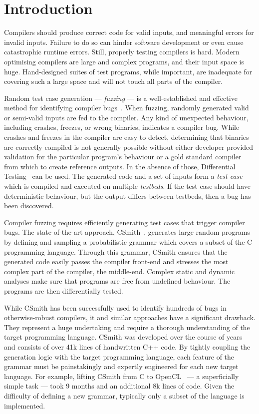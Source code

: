 \section{Introduction}

Compilers should produce correct code for valid inputs, and meaningful errors for invalid inputs. Failure to do so can hinder software development or even cause catastrophic runtime errors. Still, properly testing compilers is hard. Modern optimising compilers are large and complex programs, and their input space is huge. Hand-designed suites of test programs, while important, are inadequate for covering such a large space and will not touch all parts of the compiler.

Random test case generation --- \emph{fuzzing} --- is a well-established and effective method for identifying compiler bugs~\cite{Chen2014a,Chen2013,Kossatchev2005}. When fuzzing, randomly generated valid or semi-valid inputs are fed to the compiler. Any kind of unexpected behaviour, including crashes, freezes, or wrong binaries, indicates a compiler bug. While crashes and freezes in the compiler are easy to detect, determining that binaries are correctly compiled is not generally possible without either developer provided validation for the particular program's behaviour or a gold standard compiler from which to create reference outputs. In the absence of those, Differential Testing~\cite{McKeeman1998} can be used. The generated code and a set of inputs form a \emph{test case} which is compiled and executed on multiple \emph{testbeds}. If the test case should have deterministic behaviour, but the output differs between testbeds, then a bug has been discovered.

Compiler fuzzing requires efficiently generating test cases that trigger compiler bugs. The state-of-the-art approach, CSmith~\cite{Yang2011}, generates large random programs by defining and sampling a probabilistic grammar which covers a subset of the C programming language. Through this grammar, CSmith ensures that the generated code easily passes the compiler front-end and stresses the most complex part of the compiler, the middle-end. Complex static and dynamic analyses make sure that programs are free from undefined behaviour. The programs are then differentially tested.

While CSmith has been successfully used to identify hundreds of bugs in otherwise-robust  compilers, it and similar approaches have a significant drawback. They represent a huge undertaking and require a thorough understanding of the target programming language. CSmith was developed over the course of years and consists of over 41k lines of handwritten C++ code. By tightly coupling the generation logic with the target programming language, each feature of the grammar must be painstakingly and expertly engineered for each new target language. For example, lifting CSmith from C to OpenCL~\cite{Lidbury2015a} --- a superficially simple task --- took 9 months and an additional 8k lines of code. Given the difficulty of defining a new grammar, typically only a subset of the language is implemented.


